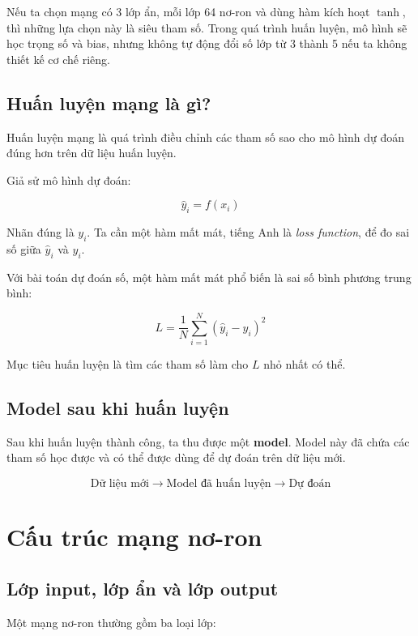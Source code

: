 \documentclass[12pt,a4paper]{report}
\begin{document}
\begin{vidu}
Nếu ta chọn mạng có 3 lớp ẩn, mỗi lớp 64 nơ-ron và dùng hàm kích hoạt $\tanh$, thì những lựa chọn này là siêu tham số. Trong quá trình huấn luyện, mô hình sẽ học trọng số và bias, nhưng không tự động đổi số lớp từ 3 thành 5 nếu ta không thiết kế cơ chế riêng.
\end{vidu}

\section{Huấn luyện mạng là gì?}

Huấn luyện mạng là quá trình điều chỉnh các tham số sao cho mô hình dự đoán đúng hơn trên dữ liệu huấn luyện.

Giả sử mô hình dự đoán:

\[
    \hat{y}_i = f(x_i)
\]

Nhãn đúng là $y_i$. Ta cần một hàm mất mát, tiếng Anh là \textit{loss function}, để đo sai số giữa $\hat{y}_i$ và $y_i$.

Với bài toán dự đoán số, một hàm mất mát phổ biến là sai số bình phương trung bình:

\[
    L = \frac{1}{N}\sum_{i=1}^{N}(\hat{y}_i-y_i)^2
\]

Mục tiêu huấn luyện là tìm các tham số làm cho $L$ nhỏ nhất có thể.

\section{Model sau khi huấn luyện}

Sau khi huấn luyện thành công, ta thu được một \textbf{model}. Model này đã chứa các tham số học được và có thể được dùng để dự đoán trên dữ liệu mới.

\[
    \text{Dữ liệu mới} \rightarrow \text{Model đã huấn luyện} \rightarrow \text{Dự đoán}
\]

\chapter{Cấu trúc mạng nơ-ron}

\section{Lớp input, lớp ẩn và lớp output}

Một mạng nơ-ron thường gồm ba loại lớp:
\end{document}
